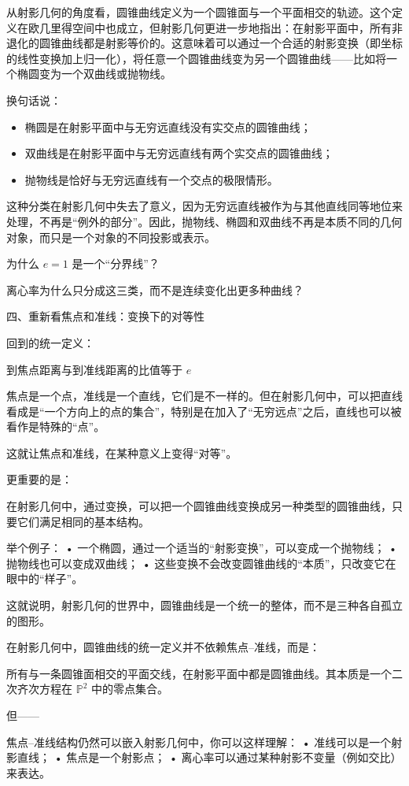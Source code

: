 从射影几何的角度看，圆锥曲线定义为一个圆锥面与一个平面相交的轨迹。这个定义在欧几里得空间中也成立，但射影几何更进一步地指出：在射影平面中，所有非退化的圆锥曲线都是射影等价的。这意味着可以通过一个合适的射影变换（即坐标的线性变换加上归一化），将任意一个圆锥曲线变为另一个圆锥曲线——比如将一个椭圆变为一个双曲线或抛物线。

换句话说：
\begin{itemize}
\item 椭圆是在射影平面中与无穷远直线没有实交点的圆锥曲线；
\item 双曲线是在射影平面中与无穷远直线有两个实交点的圆锥曲线；
\item 抛物线是恰好与无穷远直线有一个交点的极限情形。
\end{itemize}

这种分类在射影几何中失去了意义，因为无穷远直线被作为与其他直线同等地位来处理，不再是“例外的部分”。因此，抛物线、椭圆和双曲线不再是本质不同的几何对象，而只是一个对象的不同投影或表示。


为什么 $e=1$ 是一个“分界线”？

离心率为什么只分成这三类，而不是连续变化出更多种曲线？

四、重新看焦点和准线：变换下的对等性

回到的统一定义：

到焦点距离与到准线距离的比值等于 $e$

焦点是一个点，准线是一个直线，它们是不一样的。但在射影几何中，可以把直线看成是“一个方向上的点的集合”，特别是在加入了“无穷远点”之后，直线也可以被看作是特殊的“点”。

这就让焦点和准线，在某种意义上变得“对等”。

更重要的是：

在射影几何中，通过变换，可以把一个圆锥曲线变换成另一种类型的圆锥曲线，只要它们满足相同的基本结构。

举个例子：
	•	一个椭圆，通过一个适当的“射影变换”，可以变成一个抛物线；
	•	抛物线也可以变成双曲线；
	•	这些变换不会改变圆锥曲线的“本质”，只改变它在眼中的“样子”。

这就说明，射影几何的世界中，圆锥曲线是一个统一的整体，而不是三种各自孤立的图形。


在射影几何中，圆锥曲线的统一定义并不依赖焦点–准线，而是：

所有与一条圆锥面相交的平面交线，在射影平面中都是圆锥曲线。其本质是一个二次齐次方程在 $\mathbb{P}^2$ 中的零点集合。

但——

焦点–准线结构仍然可以嵌入射影几何中，你可以这样理解：
	•	准线可以是一个射影直线；
	•	焦点是一个射影点；
	•	离心率可以通过某种射影不变量（例如交比）来表达。

